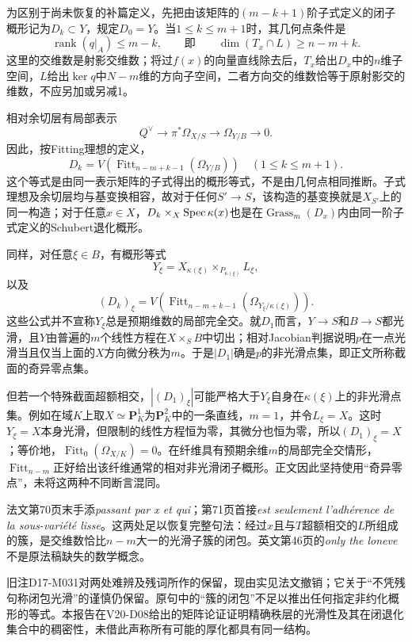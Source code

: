 为区别于尚未恢复的补篇定义，先把由该矩阵的$(m-k+1)$阶子式定义的闭子概形记为$D_k\subset Y$，规定$D_0=Y$。当$1\leq k\leq m+1$时，其几何点条件是
\[
\operatorname{rank}(q|_A)\leq m-k,
\qquad\text{即}\qquad
\dim(T_x\cap L)\geq n-m+k.
\]
这里的交维数是射影交维数；将过$f(x)$的向量直线除去后，$T_x$给出$D_x$中的$n$维子空间，$L$给出$\ker q$中$N-m$维的方向子空间，二者方向交的维数恰等于原射影交的维数，不应另加或另减1。

相对余切层有局部表示
\[
Q^\vee\longrightarrow\pi^*\Omega_{X/S}
\longrightarrow\Omega_{Y/B}\longrightarrow0.
\]
因此，按Fitting理想的定义，
\[
D_k
=V\!\left(\operatorname{Fitt}_{n-m+k-1}
                 (\Omega_{Y/B})\right)
\quad(1\leq k\leq m+1).
\]
这个等式是由同一表示矩阵的子式得出的概形等式，不是由几何点相同推断。子式理想及余切层均与基变换相容，故对于任何$S'\to S$，该构造的基变换就是$X_{S'}$上的同一构造；对于任意$x\in X$，$D_k\times_X\operatorname{Spec}\kappa(x)$也是在$\operatorname{Grass}_{m}(D_x)$内由同一阶子式定义的Schubert退化概形。

同样，对任意$\xi\in B$，有概形等式
\[
Y_\xi=X_{\kappa(\xi)}\times_{P_{\kappa(\xi)}}L_\xi,
\]
以及
\[
(D_k)_\xi
=V\!\left(\operatorname{Fitt}_{n-m+k-1}
                 (\Omega_{Y_\xi/\kappa(\xi)})\right).
\]
这些公式并不宣称$Y_\xi$总是预期维数的局部完全交。就$D_1$而言，$Y\to S$和$B\to S$都光滑，且$Y$由普遍的$m$个线性方程在$X\times_SB$中切出；相对Jacobian判据说明$p$在一点光滑当且仅当上面的$X$方向微分秩为$m$。于是$|D_1|$确是$p$的非光滑点集，即正文所称截面的奇异零点集。

但若一个特殊截面超额相交，$|(D_1)_\xi|$可能严格大于$Y_\xi$自身在$\kappa(\xi)$上的非光滑点集。例如在域$K$上取$X\simeq\mathbf P^1_K$为$\mathbf P^2_K$中的一条直线，$m=1$，并令$L_\xi=X$。这时$Y_\xi=X$本身光滑，但限制的线性方程恒为零，其微分也恒为零，所以$(D_1)_\xi=X$；等价地，$\operatorname{Fitt}_0(\Omega_{X/K})=0$。在纤维具有预期余维$m$的局部完全交情形，$\operatorname{Fitt}_{n-m}$正好给出该纤维通常的相对非光滑闭子概形。正文因此坚持使用“奇异零点”，未将这两种不同断言混同。

法文第70页末手添\emph{passant par x et qui}；第71页首接\emph{est seulement l'adhérence de la sous-variété lisse}。这两处足以恢复完整句法：经过$x$且与$T$超额相交的$L$所组成的簇，是交维数恰比$n-m$大一的光滑子簇的闭包。英文第46页的\emph{only the loneve}不是原法稿缺失的数学概念。

旧注D17-M031对两处难辨及残词所作的保留，现由实见法文撤销；它关于“不凭残句称闭包光滑”的谨慎仍保留。原句中的“簇的闭包”不足以推出任何指定非约化概形的等式。本报告在V20-D08给出的矩阵论证证明精确秩层的光滑性及其在闭退化集合中的稠密性，未借此声称所有可能的厚化都具有同一结构。

